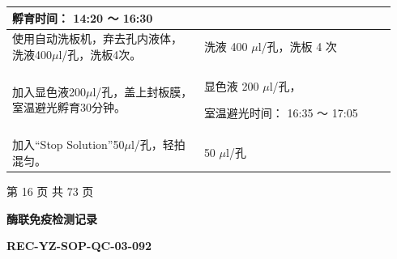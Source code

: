 \documentclass[UTF8,10pt,a4paper,fontset=fandol]{ctexart}
\newcommand{\fieldvalue}[1]{#1}
\newcommand{\handwritten}[1]{#1}
\begin{document}
\begin{tabular}{|p{0.47\linewidth}|p{0.47\linewidth}|}
\vspace{0.2em}
孵育时间：
\fieldvalue{\handwritten{14:20 ～ 16:30}} \\
\hline
使用自动洗板机，弃去孔内液体，洗液400$\mu$l/孔，洗板4次。 &
洗液
\fieldvalue{\handwritten{400}} $\mu$l/孔，洗板
\fieldvalue{\handwritten{4}} 次 \\
\hline
加入显色液200$\mu$l/孔，盖上封板膜，室温避光孵育30分钟。 &
显色液
\fieldvalue{\handwritten{200}} $\mu$l/孔，

\vspace{0.2em}
室温避光时间：
\fieldvalue{\handwritten{16:35 ～ 17:05}} \\
\hline
加入“Stop Solution”50$\mu$l/孔，轻拍混匀。 &
\fieldvalue{\handwritten{50}} $\mu$l/孔 \\
\hline
\end{tabular}
\normalsize

\begin{center}
第 16 页 共 73 页
\end{center}

\newpage

\begin{center}
\textbf{酶联免疫检测记录}
\end{center}

\noindent
\textbf{REC-YZ-SOP-QC-03-092}
\end{document}
